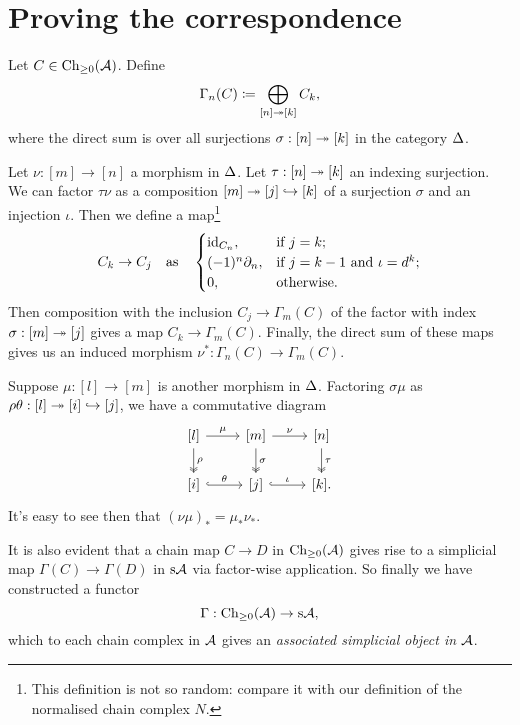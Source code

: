 \section{Proving the correspondence}

\begin{definition}
  Let $C \in \mathrm{Ch}_{\ge 0}(\mathcal{A})$. Define
  \[
  \Gamma_n(C) \coloneqq \bigoplus_{[n] \twoheadrightarrow [k]} C_k,
  \]
  where the direct sum is over all surjections $\sigma : [n] \twoheadrightarrow
  [k]$ in the category $\Delta$.

  Let $\nu : [m] \to [n]$ a morphism in $\Delta$. Let $\tau : [n]
  \twoheadrightarrow [k]$ an indexing surjection. We can factor $\tau\nu$ as a
  composition $[m] \twoheadrightarrow [j] \hookrightarrow [k]$ of a surjection $\sigma$ and an
  injection $\iota$. Then we define a map\footnote{This definition is
    not so random: compare it with our definition of the normalised
    chain complex $N$.}
  \[
  C_k \to C_j \quad\text{as}\quad
  \begin{cases}
    \operatorname{id}_{C_n}, & \text{if } j = k; \\
    (-1)^n \partial_n, & \text{if } j = k-1 \text{ and } \iota=d^k; \\
    0, & \text{otherwise}.
  \end{cases}
  \]
  Then composition with the inclusion $C_j \to \Gamma_m(C)$ of the
  factor with index $\sigma : [m] \twoheadrightarrow [j]$ gives a map $C_k \to
  \Gamma_m(C)$. Finally, the direct sum of these maps gives us an
  induced morphism $\nu^* : \Gamma_n(C) \to \Gamma_m(C)$.

  Suppose $\mu : [l] \to [m]$ is another morphism in
  $\Delta$. Factoring $\sigma\mu$ as $\rho\theta : [l] \twoheadrightarrow [i]
  \hookrightarrow [j]$, we have a commutative diagram
  \[
  \begin{tikzcd}
    {[l]} \rar{\mu} \ar[twoheadrightarrow]{d}{\rho} & {[m]} \rar{\nu}
    \ar[twoheadrightarrow]{d}{\sigma} & {[n]}
    \ar[twoheadrightarrow]{d}{\tau} \\ {[i]}
    \ar[hookrightarrow]{r}{\theta} & {[j]}
    \ar[hookrightarrow]{r}{\iota} & {[k]}.
  \end{tikzcd}
  \]
  It's easy to see then that $(\nu\mu)_* = \mu_*\nu_*$.

  It is also evident that a chain map $C \to D$ in $\mathrm{Ch}_{\ge 0}(\mathcal{A})$
  gives rise to a simplicial map $\Gamma(C) \to \Gamma(D)$ in $\mathrm{s}\mathcal{A}$
  via factor-wise application. So finally we have constructed a
  functor
  \[
  \Gamma : \mathrm{Ch}_{\ge 0}(\mathcal{A}) \to \mathrm{s}\mathcal{A},
  \]
  which to each chain complex in $\mathcal{A}$ gives an \textit{associated
    simplicial object in $\mathcal{A}$}.
\end{definition}

